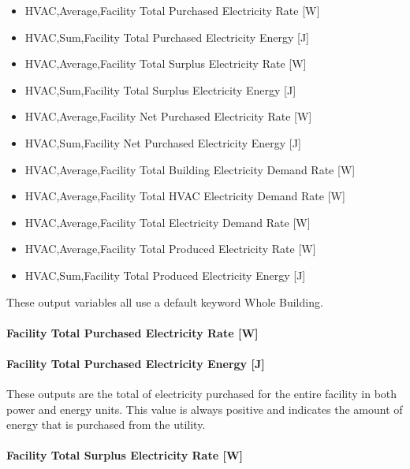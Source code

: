 \begin{itemize}
\tightlist
\item
  HVAC,Average,Facility Total Purchased Electricity Rate {[}W{]}
\item
  HVAC,Sum,Facility Total Purchased Electricity Energy {[}J{]}
\item
  HVAC,Average,Facility Total Surplus Electricity Rate {[}W{]}
\item
  HVAC,Sum,Facility Total Surplus Electricity Energy {[}J{]}
\item
  HVAC,Average,Facility Net Purchased Electricity Rate {[}W{]}
\item
  HVAC,Sum,Facility Net Purchased Electricity Energy {[}J{]}
\item
  HVAC,Average,Facility Total Building Electricity Demand Rate {[}W{]}
\item
  HVAC,Average,Facility Total HVAC Electricity Demand Rate {[}W{]}
\item
  HVAC,Average,Facility Total Electricity Demand Rate {[}W{]}
\item
  HVAC,Average,Facility Total Produced Electricity Rate {[}W{]}
\item
  HVAC,Sum,Facility Total Produced Electricity Energy {[}J{]}
\end{itemize}

These output variables all use a default keyword Whole Building.

\paragraph{Facility Total Purchased Electricity Rate {[}W{]}}\label{facility-total-purchased-electric-power-w}

\paragraph{Facility Total Purchased Electricity Energy {[}J{]}}\label{facility-total-purchased-electric-energy-j}

These outputs are the total of electricity purchased for the entire facility in both power and energy units. This value is always positive and indicates the amount of energy that is purchased from the utility.

\paragraph{Facility Total Surplus Electricity Rate {[}W{]}}\label{facility-total-surplus-electric-power-w}

